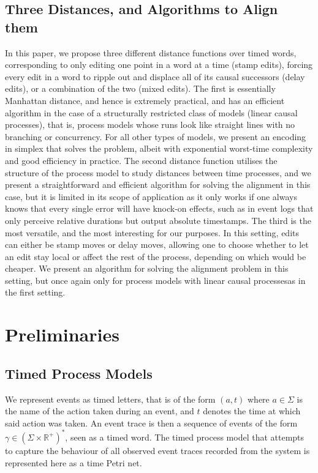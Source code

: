 \documentclass{article}
\theoremstyle{Definition}
\theoremstyle{definition}
\begin{document}
	\subsection{Three Distances, and Algorithms to Align them}
	
		In this paper, we propose three different distance functions over timed words, corresponding to only editing one point in a word at a time (stamp edits), forcing every edit in a word to ripple out and displace all of its causal successors (delay edits), or a combination of the two (mixed edits). 
		The first is essentially Manhattan distance, and hence is extremely practical, and has an efficient algorithm in the case of a structurally restricted class of models (linear causal processes), that is, process models whose runs look like straight lines with no branching or concurrency. 
		For all other types of models, we present an encoding in simplex that solves the problem, albeit with exponential worst-time complexity and good efficiency in practice. 
		The second distance function utilises the structure of the process model to study distances between time processes, and we present a straightforward and efficient algorithm for solving the alignment in this case, but it is limited in its scope of application as it only works if one always knows that every single error will have knock-on effects, such as in event logs that only perceive relative durations but output absolute timestamps. 
		The third is the most versatile, and the most interesting for our purposes. 
		In this setting, edits can either be stamp moves or delay moves, allowing one to choose whether to let an edit stay local or affect the rest of the process, depending on which would be cheaper. 
		We present an algorithm for solving the alignment problem in this setting, but once again only for process models with linear causal processesas in the first setting. 
	

	\section{Preliminaries}
	\subsection{Timed Process Models}

	
		We represent events as timed letters, that is of the form $(a,t)$ where $a \in \Sigma$ is the name of the action taken during an event, and $t$ denotes the time at which said action was taken. 
		An event trace is then a sequence of events of the form $\gamma \in (\Sigma \times \mathbb{R}^+)^*$, seen as a timed word.  
		The timed process model that attempts to capture the behaviour of all observed event traces recorded from the system is represented here as a time Petri net. 
	
\end{document}
